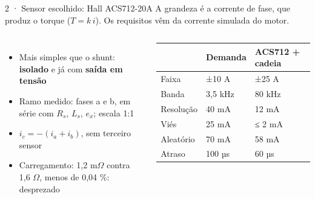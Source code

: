 \documentclass[aspectratio=169,11pt]{beamer}
\newcommand{\contexto}[1]{{\small\color{cz}#1}\par\vspace{4pt}}
\begin{document}
\begin{frame}{2 · Sensor escolhido: Hall ACS712-20A}
\contexto{A grandeza é a corrente de fase, que produz o torque ($T = k\,i$). Os requisitos vêm da corrente simulada do motor.}
\begin{columns}[c]
\begin{itemize}\setlength{\itemsep}{8pt}\small
\item Mais simples que o shunt: \textbf{isolado} e já com \textbf{saída em tensão}
\item Ramo medido: fases a e b, em série com $R_s$, $L_s$, $e_x$; escala 1:1
\item $i_c = -(i_a + i_b)$, sem terceiro sensor
\item Carregamento: 1,2 m$\Omega$ contra 1,6 $\Omega$, menos de 0,04 \%: desprezado
\end{itemize}
\centering\footnotesize
\renewcommand{\arraystretch}{1.25}
\begin{tabular}{@{}lll@{}}\toprule
 & \textbf{Demanda} & \textbf{ACS712 + cadeia}\\\midrule
Faixa & ±10 A & ±25 A\\
Banda & 3,5 kHz & 80 kHz\\
Resolução & 40 mA & 12 mA\\
Viés & 25 mA & ≤ 2 mA\\
Aleatório & 70 mA & 58 mA\\
Atraso & 100 µs & 60 µs\\\bottomrule
\end{tabular}
\end{columns}
\end{frame}
\end{document}
